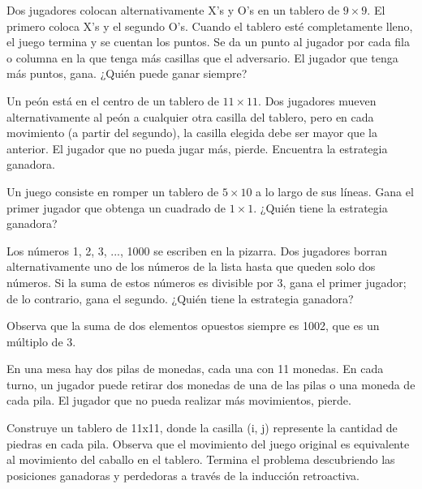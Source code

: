 \documentclass[11pt]{scrartcl}
\begin{document}
\begin{problem}
Dos jugadores colocan alternativamente X's y O's en un tablero de $9 \times 9$. El primero coloca X's y el segundo O's. Cuando el tablero esté completamente lleno, el juego termina y se cuentan los puntos. Se da un punto al jugador por cada fila o columna en la que tenga más casillas que el adversario. El jugador que tenga más puntos, gana. ¿Quién puede ganar siempre?
\end{problem}

\begin{problem}
Un peón está en el centro de un tablero de $11 \times 11$. Dos jugadores mueven alternativamente al peón a cualquier otra casilla del tablero, pero en cada movimiento (a partir del segundo), la casilla elegida debe ser mayor que la anterior. El jugador que no pueda jugar más, pierde. Encuentra la estrategia ganadora.
\end{problem}

\begin{problem}Un juego consiste en romper un tablero de $5 \times 10$ a lo largo de sus líneas. Gana el primer jugador que obtenga un cuadrado de $1 \times 1$. ¿Quién tiene la estrategia ganadora?
\end{problem}

\begin{problem}[Rusia 1997] Los números 1, 2, 3, ..., 1000 se escriben en la pizarra. Dos jugadores borran alternativamente uno de los números de la lista hasta que queden solo dos números. Si la suma de estos números es divisible por 3, gana el primer jugador; de lo contrario, gana el segundo. ¿Quién tiene la estrategia ganadora?
\begin{hint}
    Observa que la suma de dos elementos opuestos siempre es 1002, que es un múltiplo de 3.
\end{hint}
\end{problem}

\begin{problem}
En una mesa hay dos pilas de monedas, cada una con 11 monedas. En cada turno, un jugador puede retirar dos monedas de una de las pilas o una moneda de cada pila. El jugador que no pueda realizar más movimientos, pierde.
\begin{hint}
    Construye un tablero de 11x11, donde la casilla (i, j) represente la cantidad de piedras en cada pila. Observa que el movimiento del juego original es equivalente al movimiento del caballo en el tablero. Termina el problema descubriendo las posiciones ganadoras y perdedoras a través de la inducción retroactiva.
\end{hint}
\end{problem}
\end{document}
